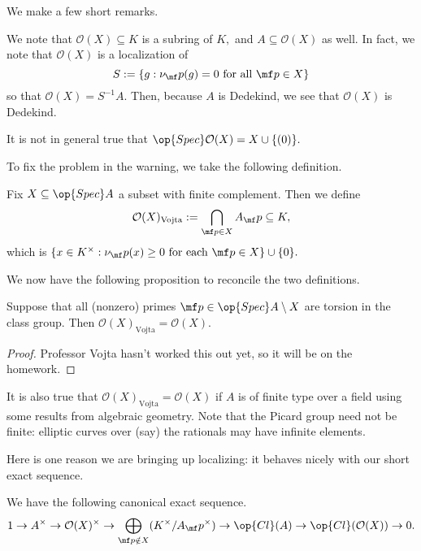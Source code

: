 We make a few short remarks.
\begin{remark}
    We note that $\mathcal O(X)\subseteq K$ is a subring of $K,$ and $A\subseteq\mathcal O(X)$ as well. In fact, we note that $\mathcal O(X)$ is a localization of
    \[S:=\{g:\nu_\mf p(g)=0\text{ for all }\mf p\in X\}\]
    so that $\mathcal O(X)=S^{-1}A.$ Then, because $A$ is Dedekind, we see that $\mathcal O(X)$ is Dedekind.
\end{remark}
\begin{warn}
    It is not in general true that $\op{Spec}\mathcal O(X)=X\cup\{(0)\}.$
\end{warn}
To fix the problem in the warning, we take the following definition.
\begin{definition}
    Fix $X\subseteq\op{Spec}A$ a subset with finite complement. Then we define
    \[\mathcal O(X)_{\text{Vojta}}:=\bigcap_{\mf p\in X}A_\mf p\subseteq K,\]
    which is $\{x\in K^\times:\nu_\mf p(x)\ge0\text{ for each }\mf p\in X\}\cup\{0\}.$
\end{definition}
We now have the following proposition to reconcile the two definitions.
\begin{proposition}
    Suppose that all (nonzero) primes $\mf p\in\op{Spec}A\setminus X$ are torsion in the class group. Then $\mathcal O(X)_{\text{Vojta}}=\mathcal O(X).$
\end{proposition}
\begin{proof}
    Professor Vojta hasn't worked this out yet, so it will be on the homework.
\end{proof}
\begin{remark}
    It is also true that $\mathcal O(X)_{\text{Vojta}}=\mathcal O(X)$ if $A$ is of finite type over a field using some results from algebraic geometry. Note that the Picard group need not be finite: elliptic curves over (say) the rationals may have infinite elements.
\end{remark}
Here is one reason we are bringing up localizing: it behaves nicely with our short exact sequence.
\begin{proposition}
    We have the following canonical exact sequence.
    \[1\to A^\times\to\mathcal O(X)^\times\to\bigoplus_{\mf p\notin X}(K^\times/A_\mf p^\times)\to\op{Cl}(A)\to\op{Cl}(\mathcal O(X))\to0.\]
\end{proposition}
